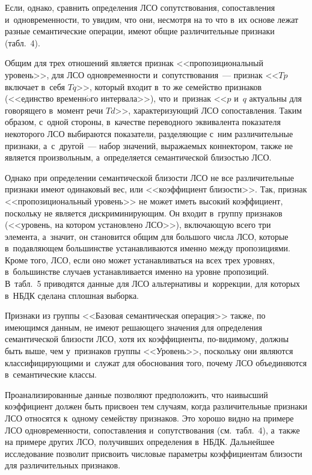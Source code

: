 \begin{multicols}{2}
  Если, однако, сравнить определения ЛСО со\-пут\-ст\-во\-ва\-ния, со\-по\-став\-ле\-ния 
  и~од\-но\-вре\-мен\-ности, то увидим, что они, не\-смот\-ря на то что в~их основе лежат 
разные семантические операции, имеют общие различительные признаки (табл.~4). 

  
  Общим для трех отношений является при\-знак <<пропозициональный 
уровень>>, для ЛСО од\-но\-вре\-мен\-ности и~со\-пут\-ст\-во\-ва\-ния~--- при\-знак <<$Tp$ 
включает в~себя $Tq$>>, который входит в~то же семейство признаков 
(<<единство временн$\acute{\mbox{o}}$го интервала>>), что и~при\-знак <<$p$ и~$q$ актуальны для 
говорящего в~момент речи $Td$>>, ха\-рак\-те\-ри\-зу\-ющий ЛСО со\-по\-став\-ле\-ния. 
Таким образом, с~одной стороны, в~качестве переводного эквивалента 
показателя некоторого ЛСО выбираются показатели, раз\-де\-ля\-ющие с~ним 
различительные признаки, а~с~другой~--- набор значений, вы\-ра\-жа\-емых 
коннектором, та\-кже не является произвольным, а~определяется семантической 
бли\-зостью ЛСО.
  
  Однако при определении семантической близости ЛСО не все 
различительные при\-зна\-ки имеют одинаковый вес, или <<коэффициент  
бли\-зости>>. Так, признак <<пропозициональный уровень>> не может иметь 
высокий коэффициент, поскольку не является дис\-кри\-ми\-ни\-ру\-ющим. Он входит 
в~группу при\-зна\-ков (<<уровень, на котором установлено ЛСО>>), 
вклю\-ча\-ющую всего три элемента, а~значит, он становится общим для большого 
чис\-ла ЛСО, которые в~по\-дав\-ля\-ющем большинстве уста\-нав\-ли\-ва\-ют\-ся именно 
между пропозициями. Кроме того, ЛСО, если оно может уста\-нав\-ли\-вать\-ся на 
всех трех уров\-нях, в~большинстве случаев уста\-нав\-ли\-ва\-ет\-ся именно на уров\-не 
пропозиций. В~табл.~5 приводятся данные для ЛСО альтернативы и~коррекции, 
для которых в~НБДК сделана сплош\-ная вы\-борка.

  
  Признаки из группы <<Базовая семантическая операция>> так\-же, по 
име\-ющим\-ся данным, не имеют ре\-ша\-юще\-го значения для определения 
семантической бли\-зости ЛСО, хотя их коэффициенты, по-ви\-ди\-мо\-му, 
долж\-ны быть выше, чем у~признаков группы <<Уровень>>, поскольку они 
являются классифицирующими и~служат для обосно\-ва\-ния того, почему ЛСО 
объединяются в~семантические \mbox{классы}. 
{

}
  
  Проанализированные данные поз\-во\-ля\-ют предположить, что на\-и\-выс\-ший 
коэффициент дол\-жен быть присвоен тем случаям, когда различительные 
при\-зна\-ки ЛСО относятся к~одному семейству признаков. Это хорошо вид\-но на 
примере ЛСО од\-но\-вре\-мен\-ности, со\-по\-став\-ле\-ния и~со\-пут\-ст\-во\-ва\-ния (см.\ табл.~4), 
а~так\-же на примере других ЛСО, получивших определения в~НБДК. 
Дальнейшее исследование поз\-во\-лит присвоить чис\-ло\-вые па\-ра\-мет\-ры 
коэффициентам бли\-зости для различительных при\-знаков.
{

}
\end{multicols}
